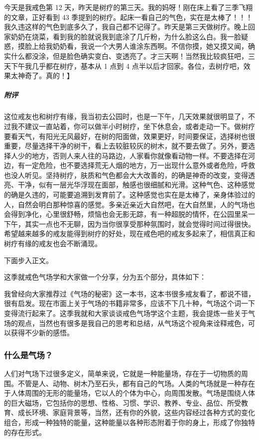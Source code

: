 \begin{case}
    今天是我戒色第 12 天，昨天是树疗的第三天。我的妈呀！刚在床上看了三季飞翔的文章，正好看到 43 季提到的树疗。起床一看自己的气色，实在是太棒了！！！我久违这样的气色到底多久了，我自己都不记得了。昨天是第三天做树疗。晚上回家奶奶在烧菜，看到我的脸就说我到底涂了几斤粉，为什么脸这么白。我一脸疑惑，摸脸上给我奶奶看，我说一个大男人谁涂东西啊。不信你摸，她又摸又闻，确实什么都没涂，但是脸色确实变白、变透亮了。才三天啊！当然我比较疯狂吧，三天下午我几乎都在树疗，基本从 1 点到 4 点半以后才回家。各位，去树疗吧，效果太神奇了。真的！】
    \subparagraph{附评} 这位戒友也和树疗有缘，我当初去公园时，也是一下午，几天效果就很明显了，不过我不建议一直站着，你可以做半小时树疗，坐下休息会，或者走动一下。做树疗要看天气，有阳光无风最好，在树的阳面做，效果更好，时间要保证，选择树也很重要，尽量选择干净的树干，看上去较脏较灰的树木，就不要去做了。另外，要选择人少的地方，否则人来人往的马路边，人家看你就像看动物一样。不要选择在河边，有一定危险，也不要选择荒无人烟的地方，万一出现什么意外或者危险，呼救也没人听见。坚持树疗，肤质和气色都会大大改善的，的确是神奇的改变，变得透亮、干净，似有一层光华浮现在面部，触感也很细腻和光滑。这种气色、这种感觉的确是久违的，可能要追溯到发育前了。这种感觉也实在是太棒了，亲身体验过的人，自然会明白那种惊喜的感觉。多亲近亲近大自然吧，在大自然里，人的气场也会得到净化，心里很舒畅，烦恼也会无影无踪，有一种超脱的情怀，在公园里呆一下午，其实一点也不无聊，因为当你很享受那种氛围时，就会觉得时间过得很快。希望越来越多的戒友能得到树疗的好处，现在戒色吧的戒友多起来了，相信真正和树疗有缘的戒友也会不断涌现。
\end{case}

下面步入正文。

这季就戒色气场学和大家做一个分享，分为五个部分，具体如下：

我曾经向大家推荐过《气场的秘密》这一本书，这本书很多戒友看了，都说不错，很有启发。现在市面上关于气场的书籍非常多，应该不下几十种，气场这个词一下变得流行起来了。这季我就和大家谈谈戒色气场学这个主题，我会提炼一些关于气场的观点，当然也有很多是我自己的思考和总结，从气场这个视角来诠释戒色，可以获得不少新的感悟。

\subsubsection{什么是气场？}

人们对气场下过很多定义，简单来说，它就是一种能量场，存在于一切物质的周围。不管是人、动物、树木乃至石头，都有自己的气场。人类的气场就是一种存在于人体周围的无形的能量场，它以人的个体为中心，向周围发散。气场是围绕人体的巨大磁场，它包括你的思想、性格、习惯、学识、教养、专业、品位、所受教育、成长环境、家庭背景等，当然，还有你的外貌，这些内容经过各种方式的变化组合，形成一种独特的能量，这种能量以各种形态附着于你的身上，形成了你独特的存在形式。

